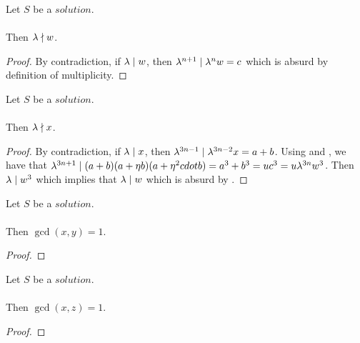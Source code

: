 \begin{lemma}
    \label{lmm:lambda_not_dvd_w}
    \leanok
    Let $S$ be a $solution$.\\\\
    Then $\lambda \nmid w$.
\end{lemma}
\begin{proof}
    \leanok
    By contradiction, if $\lambda \mid w$, then $\lambda^{n+1} \mid \lambda^n  w
    = c$ which is absurd by definition of multiplicity.
\end{proof}

\begin{lemma}
    \label{lmm:lambda_not_dvd_x}
    \leanok
    Let $S$ be a $solution$.\\\\
    Then $\lambda \nmid x$.
\end{lemma}
\begin{proof}
    \leanok
    By contradiction, if $\lambda \mid x$, then
    $\lambda^{3n-1} \mid \lambda^{3n-2}  x = a+b$. Using 
    and , we have that $\lambda^{3n+1} \mid
    (a+b)  (a + \eta  b)  (a + \eta^2 cdot b) = a^3+b^3
    = u c^3 = u \lambda^{3n} w^3$.
    Then $\lambda \mid w^3$ which implies that $\lambda \mid w$
    which is absurd by .
\end{proof}

\begin{lemma}
    \label{lmm:coprime_x_y}
    \leanok
    Let $S$ be a $solution$.\\\\
    Then $\gcd(x, y) = 1$.
\end{lemma}
\begin{proof}
    \leanok
\end{proof}

\begin{lemma}
    \label{lmm:coprime_x_z}
    \leanok
    Let $S$ be a $solution$.\\\\
    Then $\gcd(x, z) = 1$.
\end{lemma}
\begin{proof}
    \leanok
\end{proof}

